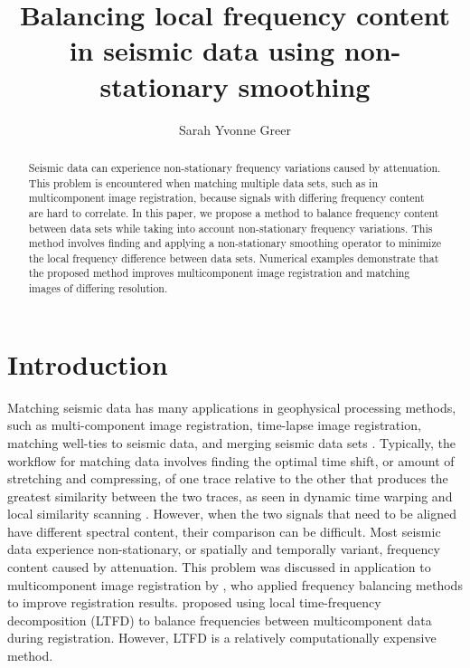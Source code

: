 \title{Balancing local frequency content in seismic data using non-stationary smoothing}
\author{Sarah Yvonne Greer}
\maketitle

\begin{abstract}
        Seismic data can experience non-stationary frequency variations caused by attenuation. This
        problem is encountered when matching multiple data sets, such as in multicomponent image
        registration, because signals with differing frequency content are hard to correlate. In
        this paper, we propose a method to balance frequency content between data sets while taking
        into account non-stationary frequency variations. This method involves finding and applying
        a non-stationary smoothing operator to minimize the local frequency difference between data
        sets. Numerical examples demonstrate that the proposed method improves multicomponent image
        registration and matching images of differing resolution. 
\end{abstract}

\section{Introduction}
        Matching seismic data has many applications in geophysical processing methods, such as
        multi-component image registration, time-lapse image registration, matching well-ties to
        seismic data, and merging seismic data sets \cite[]{ps,fomel2003,lumley,herrera2012}.
        Typically, the workflow for matching data involves finding the optimal time shift, or amount
        of stretching and compressing, of one trace relative to the other that produces the greatest
        similarity between the two traces, as seen in dynamic time warping and local similarity
        scanning \cite[]{hale2013, timelapse, herrera}. However, when the two signals that need to
        be aligned have different spectral content, their comparison can be difficult. Most seismic
        data experience non-stationary, or spatially and temporally variant, frequency content
        caused by attenuation. This problem was discussed in application to multicomponent image
        registration by \cite{fomel2003}, who applied frequency balancing methods to improve
        registration results. \cite{ltft} proposed using local time-frequency decomposition (LTFD)
        to balance frequencies between multicomponent data during registration. However, LTFD is a
        relatively computationally expensive method.
        
